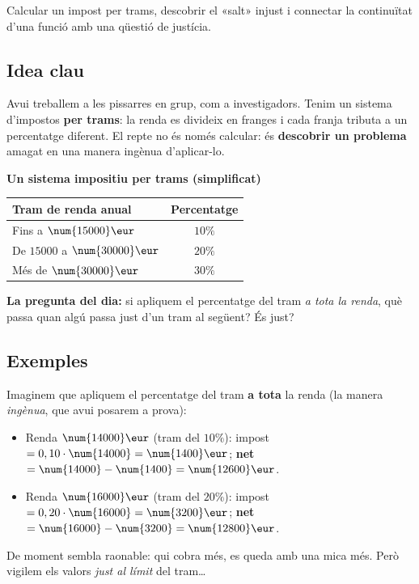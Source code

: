 %
{Calcular un impost per trams, descobrir el «salt» injust i connectar la continuïtat d'una funció amb una qüestió de justícia.}

\subsection{Idea clau}

Avui treballem a les pissarres en grup, com a investigadors. Tenim un sistema
d'impostos \textbf{per trams}: la renda es divideix en franges i cada franja tributa
a un percentatge diferent. El repte no és només calcular: és \textbf{descobrir un
problema} amagat en una manera ingènua d'aplicar-lo.

\begin{idea}
\textbf{Un sistema impositiu per trams (simplificat)}
\begin{center}
\begin{tabular}{l c}
\toprule
\textbf{Tram de renda anual} & \textbf{Percentatge} \\
\midrule
Fins a $\num{15000}\eur$ & $10\%$ \\
De $\num{15000}$ a $\num{30000}\eur$ & $20\%$ \\
Més de $\num{30000}\eur$ & $30\%$ \\
\bottomrule
\end{tabular}
\end{center}
\textbf{La pregunta del dia:} si apliquem el percentatge del tram \emph{a tota la
renda}, què passa quan algú passa just d'un tram al següent? És just?
\end{idea}

\subsection{Exemples}

\begin{exemple}
Imaginem que apliquem el percentatge del tram \textbf{a tota} la renda (la manera
\emph{ingènua}, que avui posarem a prova):
\begin{itemize}[leftmargin=1.4em, itemsep=2pt]
  \item Renda $\num{14000}\eur$ (tram del $10\%$): impost $=0,10\cdot\num{14000}=\num{1400}\eur$;
        \textbf{net} $=\num{14000}-\num{1400}=\num{12600}\eur$.
  \item Renda $\num{16000}\eur$ (tram del $20\%$): impost $=0,20\cdot\num{16000}=\num{3200}\eur$;
        \textbf{net} $=\num{16000}-\num{3200}=\num{12800}\eur$.
\end{itemize}
De moment sembla raonable: qui cobra més, es queda amb una mica més. Però vigilem
els valors \emph{just al límit} del tram\dots
\end{exemple}

